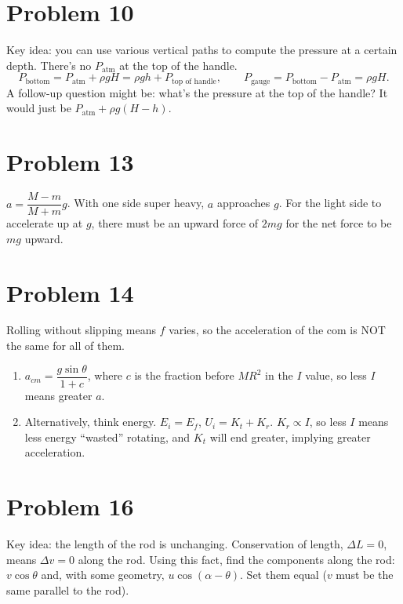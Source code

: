 \documentclass[11pt]{article}
\begin{document}
\section*{Problem 10}
Key idea: you can use various vertical paths to compute the pressure at a certain depth.
There's no $P_{\text{atm}}$ at the top of the handle.
\[
P_{\text{bottom}}=P_{\text{atm}}+\rho gH=\rho gh+P_{\text{top of handle}},\qquad
P_{\text{gauge}}=P_{\text{bottom}}-P_{\text{atm}}=\rho gH.
\]
A follow-up question might be: what's the pressure at the top of the handle? It would just be $P_{\text{atm}}+\rho g(H-h)$.

\section*{Problem 13}
$a=\dfrac{M-m}{M+m}g$. With one side super heavy, $a$ approaches $g$.
For the light side to accelerate up at $g$, there must be an upward force of $2mg$ for the net force to be $mg$ upward.

\section*{Problem 14}
Rolling without slipping means $f$ varies, so the acceleration of the com is NOT the same for all of them.
\begin{enumerate}[leftmargin=*, itemsep=0.25em]
\item $a_{cm}=\dfrac{g\sin\theta}{1+c}$, where $c$ is the fraction before $MR^2$ in the $I$ value, so less $I$ means greater $a$.
\item Alternatively, think energy. $E_i=E_f$, $U_i=K_t+K_r$. $K_r\propto I$, so less $I$ means less energy ``wasted'' rotating, and $K_t$ will end greater, implying greater acceleration.
\end{enumerate}

\section*{Problem 16}
Key idea: the length of the rod is unchanging. Conservation of length, $\Delta L=0$, means $\Delta v=0$ along the rod.
Using this fact, find the components along the rod: $v\cos\theta$ and, with some geometry, $u\cos(\alpha-\theta)$. Set them equal ($v$ must be the same parallel to the rod).
\end{document}

